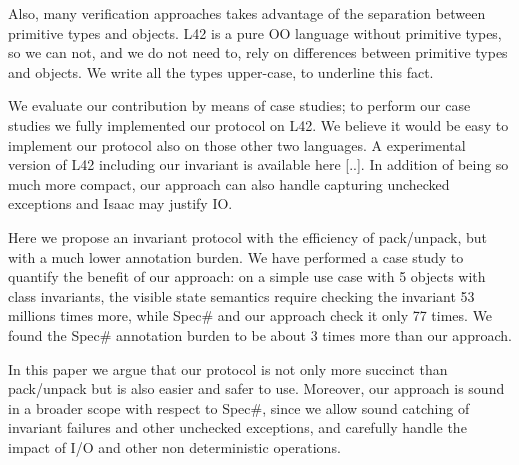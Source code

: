 Also, many verification approaches takes advantage of the separation between primitive types and objects.
L42 is a pure OO language without primitive types, so we can not, and we do not need to, rely
on differences between primitive types and objects.
We write all the types upper-case, to underline this fact.


We evaluate our contribution by means of case studies;
to perform our case studies we fully implemented our protocol on L42.
We believe it would be easy to implement our protocol also on those other two languages.
A experimental version of L42 including our invariant is available here [..].
In addition of being so much more compact, our approach can also handle capturing unchecked exceptions
and Isaac may justify IO.


\LINE




Here we propose an invariant protocol with the 
efficiency of pack/unpack, but with a much lower annotation burden.
We have performed a case study to quantify the benefit of our approach:
on a simple use case with 5 objects with class invariants, the visible state semantics 
require checking the invariant 53 millions times more,
while Spec\# and our approach check it only 77 times.
We found the Spec\# annotation burden to be about 3 times more 
than our approach.

In this paper we argue that our protocol is not only more succinct than pack/unpack but is also easier and safer to use.
Moreover, our approach is sound in a broader scope with respect to Spec\#, since we allow sound catching of invariant failures and other unchecked exceptions, and carefully handle
the impact of I/O and other non deterministic operations.

